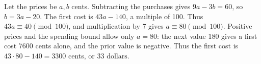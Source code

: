 Let the prices be $a,b$ cents. Subtracting the purchases gives $9a-3b=60$, so $b=3a-20$. The first cost is $43a-140$, a multiple of 100. Thus $43a\equiv40\pmod{100}$, and multiplication by 7 gives $a\equiv80\pmod{100}$. Positive prices and the spending bound allow only $a=80$: the next value 180 gives a first cost 7600 cents alone, and the prior value is negative. Thus the first cost is $43\cdot80-140=3300$ cents, or $\boxed{33\text{ dollars}}$.
